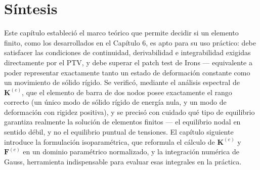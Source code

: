 \section{Síntesis}

Este capítulo estableció el marco teórico que permite decidir si un elemento finito, como los desarrollados en el Capítulo 6, es apto para su uso práctico: debe satisfacer las condiciones de continuidad, derivabilidad e integrabilidad exigidas directamente por el PTV, y debe superar el patch test de Irons --- equivalente a poder representar exactamente tanto un estado de deformación constante como un movimiento de sólido rígido. Se verificó, mediante el análisis espectral de $\bm K^{(e)}$, que el elemento de barra de dos nodos posee exactamente el rango correcto (un único modo de sólido rígido de energía nula, y un modo de deformación con rigidez positiva), y se precisó con cuidado qué tipo de equilibrio garantiza realmente la solución de elementos finitos --- el equilibrio nodal en sentido débil, y no el equilibrio puntual de tensiones. El capítulo siguiente introduce la formulación isoparamétrica, que reformula el cálculo de $\bm K^{(e)}$ y $\bm F^{(e)}$ en un dominio paramétrico normalizado, y la integración numérica de Gauss, herramienta indispensable para evaluar esas integrales en la práctica.
